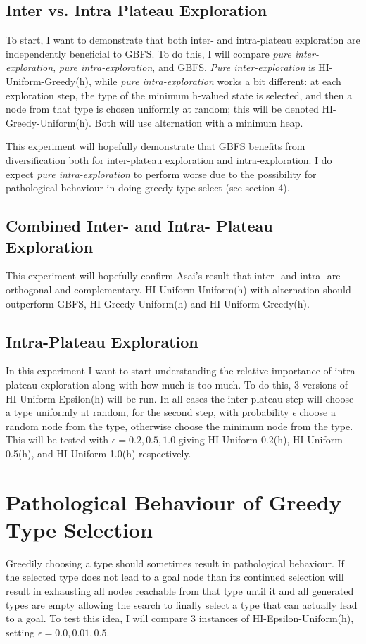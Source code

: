 \documentclass{article}
\theoremstyle{definition}
\begin{document}
\subsection{Inter vs. Intra Plateau Exploration}
To start, I want to demonstrate that both inter- and intra-plateau exploration are independently beneficial to GBFS. To do this, I will compare \textit{pure inter-exploration}, \textit{pure intra-exploration}, and GBFS. \textit{Pure inter-exploration} is HI-Uniform-Greedy(h), while \textit{pure intra-exploration} works a bit different: at each exploration step, the type of the minimum h-valued state is selected, and then a node from that type is chosen uniformly at random; this will be denoted HI-Greedy-Uniform(h). Both will use alternation with a minimum heap. 

This experiment will hopefully demonstrate that GBFS benefits from diversification both for inter-plateau exploration and intra-exploration. I do expect \textit{pure intra-exploration} to perform worse due to the possibility for pathological behaviour in doing greedy type select (see section 4). 

\subsection{Combined Inter- and Intra- Plateau Exploration}
This experiment will hopefully confirm Asai's result that inter- and intra- are orthogonal and complementary. HI-Uniform-Uniform(h) with alternation should outperform GBFS, HI-Greedy-Uniform(h) and HI-Uniform-Greedy(h).

\subsection{Intra-Plateau Exploration}
In this experiment I want to start understanding the relative importance of intra-plateau exploration along with how much is too much. To do this, 3 versions of HI-Uniform-Epsilon(h) will be run. In all cases the inter-plateau step will choose a type uniformly at random, for the second step, with probability $\epsilon$ choose a random node from the type, otherwise choose the minimum node from the type. This will be tested with $\epsilon=0.2,0.5,1.0$ giving HI-Uniform-0.2(h), HI-Uniform-0.5(h), and HI-Uniform-1.0(h) respectively.

\section{Pathological Behaviour of Greedy Type Selection}
Greedily choosing a type should sometimes result in pathological behaviour. If the selected type does not lead to a goal node than its continued selection will result in exhausting all nodes reachable from that type until it and all generated types are empty allowing the search to finally select a type that can actually lead to a goal. To test this idea, I will compare 3 instances of HI-Epsilon-Uniform(h), setting $\epsilon=0.0, 0.01, 0.5$.
\end{document}
